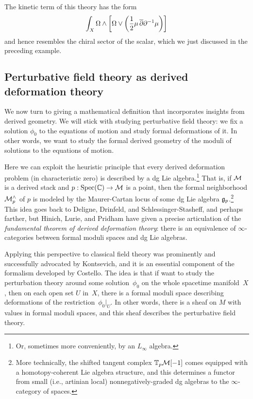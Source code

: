 \documentclass[11pt]{amsart}
\def\del{\partial}
\def\Spec{\text{Spec}}
\begin{document}
\begin{rmk}
The kinetic term of this theory has the form
\[
\int_X \Omega \wedge \left[\Omega \vee \left(\frac12 \mu\, \dbar \del^{-1} \mu\right) \right]
\]
and hence resembles the chiral sector of the scalar, which we just discussed in the preceding example.
\end{rmk}

\subsection{Perturbative field theory as derived deformation theory}
\label{sec: pert dfn}

We now turn to giving a mathematical definition that incorporates insights from derived geometry.
We will stick with studying perturbative field theory: 
we fix a solution $\phi_0$ to the equations of motion and study formal deformations of it.
In other words, we want to study the formal derived geometry of the moduli of solutions to the equations of motion.

Here we can exploit the heuristic principle that every derived deformation problem (in characteristic zero) is described by a dg Lie algebra.\footnote{Or, sometimes more conveniently, by an $L_\infty$ algebra.}
That is, if $\mathcal M$ is a derived stack and $p: \Spec(\CC) \to \cM$ is a point, 
then the formal neighborhood $\mathcal M^\wedge_p$ of $p$ is modeled by the Maurer-Cartan locus of some dg Lie algebra $\mathfrak g_p$.\footnote{More technically, the shifted tangent complex $\mathbb T_p \mathcal M[-1]$ comes equipped with a homotopy-coherent Lie algebra structure, 
and this determines a functor from small (i.e., artinian local) nonnegatively-graded dg algebras to the $\infty$-category of spaces.}
This idea goes back to Deligne, Drinfeld, and Schlessinger-Stasheff, and perhaps farther, 
but Hinich, Lurie, and Pridham have given a precise articulation of the {\em fundamental theorem of derived deformation theory}:
there is an equivalence of $\infty$-categories between formal moduli spaces and dg Lie algebras.

Applying this perspective to classical field theory was prominently and successfully advocated by Kontsevich, 
and it is an essential component of the formalism developed by Costello.
The idea is that if want to study the perturbation theory around some solution~$\phi_0$ on the whole spacetime manifold~$X$,
then on each open set $U$ in~$X$,
there is a formal moduli space describing deformations of the restriction~$\phi_0|_U$.
In other words, there is a sheaf on $M$ with values in formal moduli spaces,
and this sheaf describes the perturbative field theory.
\end{document}

